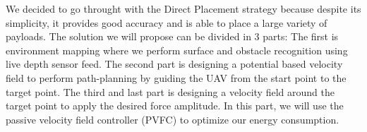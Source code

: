 We decided to go throught with the Direct Placement strategy because despite its simplicity, it provides good accuracy and is able to place a large variety of payloads. 
The solution we will propose can be divided in 3 parts: The first is environment mapping where we perform surface and obstacle recognition using live depth sensor feed. The second part is designing a potential based velocity field to perform path-planning by guiding the UAV from the start point to the target point. The third and last part is designing a velocity field around the target point to apply the desired force amplitude. In this part, we will use the passive velocity field controller (PVFC) to optimize our energy consumption.

